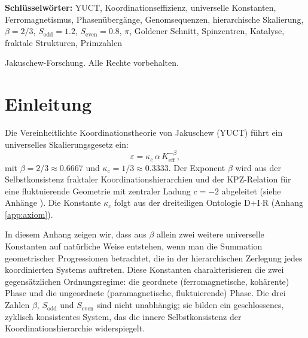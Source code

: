 \documentclass[12pt,a4paper]{article}
\begin{document}
\begin{titlepage}
\begin{center}
\begin{minipage}{0.9\textwidth}
\begin{abstract}
					Darüber hinaus treten dieselben Konstanten in der asymptotischen Verteilung der Primzahlen auf, was eine unabhängige quantitative Verifikation von YUCT liefert: die theoretische Korrektur zur Rosserschen Formel für die \(n\)-te Primzahl lautet \(-\frac{S_{\text{even}}}{2}n^{1-\beta}\ln n\) (Anhang PrimeN). Die Existenz einer solchen selbstkonsistenten Struktur demonstriert die Vorhersagekraft von YUCT und bietet eine neue quantitative Sprache zur Beschreibung von Ordnungs-Unordnungs-Übergängen auf allen Skalen.
				\end{abstract}
			\end{minipage}
			
			\vspace{1cm}
			\noindent
			\small\textbf{Schlüsselwörter:} YUCT, Koordinationseffizienz, universelle Konstanten, Ferromagnetismus, Phasenübergänge, Genomsequenzen, hierarchische Skalierung, \(\beta = 2/3\), \(S_{\text{odd}} = 1.2\), \(S_{\text{even}} = 0.8\), \(\pi\), Goldener Schnitt, Spinzentren, Katalyse, fraktale Strukturen, Primzahlen
			
			\vspace{0.5cm}
			\noindent
			 Jakuschew-Forschung. Alle Rechte vorbehalten.
		\end{center}
	\end{titlepage}
	
	\tableofcontents
	\newpage
	
	\section{Einleitung}
	Die Vereinheitlichte Koordinationstheorie von Jakuschew (YUCT) führt ein universelles Skalierungsgesetz ein:
	\[
	\varepsilon = \kappa_c \, \alpha \, K_{\mathrm{eff}}^{-\beta},
	\]
	mit \(\beta = 2/3 \approx 0.6667\) und \(\kappa_c = 1/3 \approx 0.3333\). Der Exponent \(\beta\) wird aus der Selbstkonsistenz fraktaler Koordinationshierarchien und der KPZ-Relation für eine fluktuierende Geometrie mit zentraler Ladung \(c = -2\) abgeleitet (siehe Anhänge \cite{AppendixL, AppendixY}). Die Konstante \(\kappa_c\) folgt aus der dreiteiligen Ontologie D+I\(\cdot\)R (Anhang \ref{app:axiom}).
	
	In diesem Anhang zeigen wir, dass aus \(\beta\) allein zwei weitere universelle Konstanten auf natürliche Weise entstehen, wenn man die Summation geometrischer Progressionen betrachtet, die in der hierarchischen Zerlegung jedes koordinierten Systems auftreten. Diese Konstanten charakterisieren die zwei gegensätzlichen Ordnungsregime: die geordnete (ferromagnetische, kohärente) Phase und die ungeordnete (paramagnetische, fluktuierende) Phase. Die drei Zahlen \(\beta\), \(S_{\text{odd}}\) und \(S_{\text{even}}\) sind nicht unabhängig; sie bilden ein geschlossenes, zyklisch konsistentes System, das die innere Selbstkonsistenz der Koordinationshierarchie widerspiegelt.
	
\end{document}
